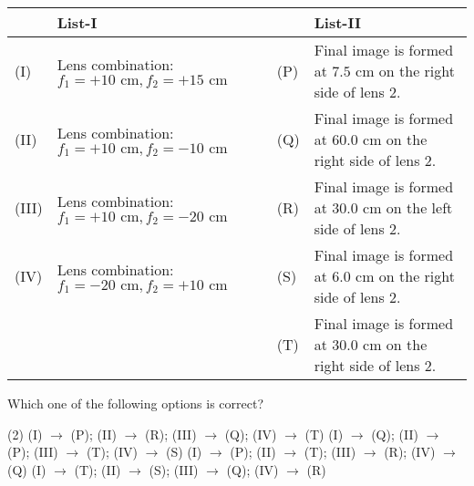 \documentclass{article}
\begin{document}
\begin{enumerate}
    \begin{center}
        \renewcommand{\arraystretch}{1.5}
        \begin{table}[h]
            \centering
            \begin{tabular}{p{0.25cm}p{5.5cm}|p{0.25cm}p{6.5cm}}
            \hline
            & List-I & & List-II \\
            \hline
            (I)& Lens combination: $f_1 = +10 \text{ cm}, f_2 = +15 \text{ cm}$ & (P) &Final image is formed at $7.5 \text{ cm}$ on the right side of lens 2.\\
            (II)& Lens combination: $f_1 = +10 \text{ cm}, f_2 = -10 \text{ cm}$ & (Q) &Final image is formed at $60.0 \text{ cm}$ on the right side of lens 2.\\
            (III)& Lens combination: $f_1 = +10 \text{ cm}, f_2 = -20 \text{ cm}$ & (R) &Final image is formed at $30.0 \text{ cm}$ on the left side of lens 2.\\
            (IV)& Lens combination: $f_1 = -20 \text{ cm}, f_2 = +10 \text{ cm}$ & (S) &Final image is formed at $6.0 \text{ cm}$ on the right side of lens 2.\\
            & & (T) &Final image is formed at $30.0 \text{ cm}$ on the right side of lens 2.\\
            \hline
            \end{tabular}
        \end{table}
    \end{center}
    Which one of the following options is correct?

    \begin{tasks}(2)
        \task (I) $\rightarrow$ (P); (II) $\rightarrow$ (R); (III) $\rightarrow$ (Q); (IV) $\rightarrow$ (T)
        \task (I) $\rightarrow$ (Q); (II) $\rightarrow$ (P); (III) $\rightarrow$ (T); (IV) $\rightarrow$ (S)
        \task (I) $\rightarrow$ (P); (II) $\rightarrow$ (T); (III) $\rightarrow$ (R); (IV) $\rightarrow$ (Q)
        \task (I) $\rightarrow$ (T); (II) $\rightarrow$ (S); (III) $\rightarrow$ (Q); (IV) $\rightarrow$ (R)
    \end{tasks}


\end{enumerate}
\end{document}
